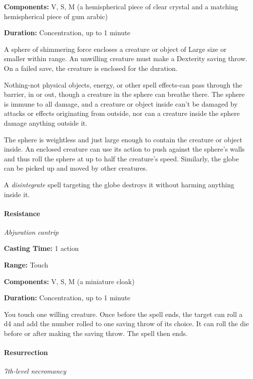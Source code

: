\documentclass[
]{article}
\begin{document}
\textbf{Components:} V, S, M (a hemispherical piece of clear crystal and
a matching hemispherical piece of gum arabic)

\textbf{Duration:} Concentration, up to 1 minute

A sphere of shimmering force encloses a creature or object of Large size
or smaller within range. An unwilling creature must make a Dexterity
saving throw. On a failed save, the creature is enclosed for the
duration.

Nothing-not physical objects, energy, or other spell effects-can pass
through the barrier, in or out, though a creature in the sphere can
breathe there. The sphere is immune to all damage, and a creature or
object inside can't be damaged by attacks or effects originating from
outside, nor can a creature inside the sphere damage anything outside
it.

The sphere is weightless and just large enough to contain the creature
or object inside. An enclosed creature can use its action to push
against the sphere's walls and thus roll the sphere at up to half the
creature's speed. Similarly, the globe can be picked up and moved by
other creatures.

A \emph{disintegrate} spell targeting the globe destroys it without
harming anything inside it.

\hypertarget{resistance}{%
\paragraph{Resistance}\label{resistance}}

\emph{Abjuration cantrip}

\textbf{Casting Time:} 1 action

\textbf{Range:} Touch

\textbf{Components:} V, S, M (a miniature cloak)

\textbf{Duration:} Concentration, up to 1 minute

You touch one willing creature. Once before the spell ends, the target
can roll a d4 and add the number rolled to one saving throw of its
choice. It can roll the die before or after making the saving throw. The
spell then ends.

\hypertarget{resurrection}{%
\paragraph{Resurrection}\label{resurrection}}

\emph{7th-level necromancy}
\end{document}
